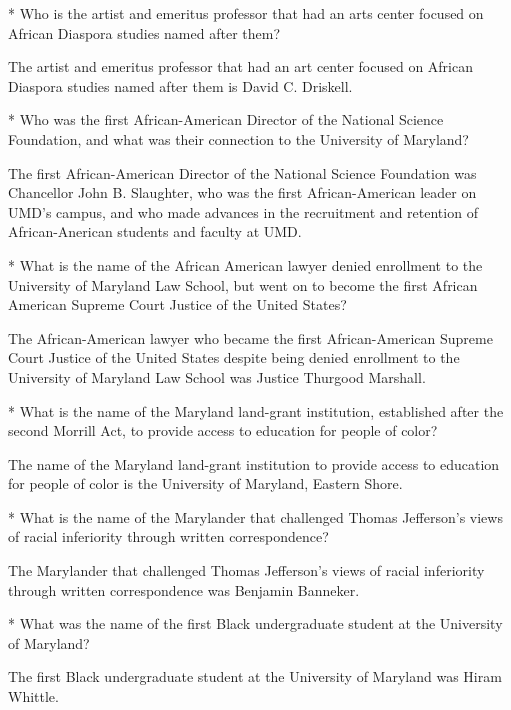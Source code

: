\begin{hwkProblem}{5}{}*
	Who is the artist and emeritus professor that had an arts center focused on African Diaspora studies named after them?

	\hwkSol

	The artist and emeritus professor that had an art center focused on African Diaspora studies named after them is David C. Driskell.
\end{hwkProblem}

\begin{hwkProblem}{6}{}*
	Who was the first African-American Director of the National Science Foundation, and what was their connection to the University of Maryland?

	\hwkSol

	The first African-American Director of the National Science Foundation was Chancellor John B. Slaughter, who was the first African-American leader on UMD's campus, and who made advances in the recruitment and retention of African-Anerican students and faculty at UMD.
\end{hwkProblem}

\begin{hwkProblem}{7}{}*
	What is the name of the African American lawyer denied enrollment to the University of Maryland Law School, but went on to become the first African American Supreme Court Justice of the United States?

	\hwkSol

	The African-American lawyer who became the first African-American Supreme Court Justice of the United States despite being denied enrollment to the University of Maryland Law School was Justice Thurgood Marshall.
\end{hwkProblem}

\begin{hwkProblem}{8}{}*
	What is the name of the Maryland land-grant institution, established after the second Morrill Act, to provide access to education for people of color?

	\hwkSol

	The name of the Maryland land-grant institution to provide access to education for people of color is the University of Maryland, Eastern Shore.
\end{hwkProblem}

\begin{hwkProblem}{9}{}*
	What is the name of the Marylander that challenged Thomas Jefferson’s views of racial inferiority through written correspondence?

	\hwkSol

	The Marylander that challenged Thomas Jefferson's views of racial inferiority through written correspondence was Benjamin Banneker.
\end{hwkProblem}

\begin{hwkProblem}{10}{}*
	What was the name of the first Black undergraduate student at the University of Maryland?

	\hwkSol

	The first Black undergraduate student at the University of Maryland was Hiram Whittle.
\end{hwkProblem}


